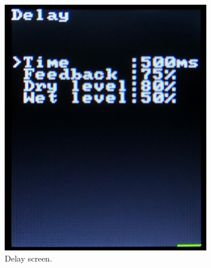 \documentclass[a4paper,twoside,12pt]{book}
\begin{document}
\begin{figure}[H]
    \centering
    \begin{subfigure}[t]{0.23\textwidth}
        \includegraphics[width=\textwidth]{images/screen1}
        \caption{Delay screen.}
    \end{subfigure}
    ~
    \begin{subfigure}[t]{0.23\textwidth}

\end{subfigure}
\end{figure}
\end{document}

